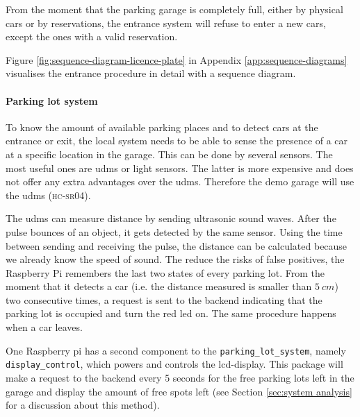 \ind From the moment that the parking garage is completely full, either by physical cars or by reservations, the entrance system will refuse to enter a new cars, except the ones with a valid reservation.

\ind Figure \ref{fig:sequence-diagram-licence-plate} in Appendix \ref{app:sequence-diagrams} visualises the entrance procedure in detail with a sequence diagram.

\paragraph{Parking lot system}
To know the amount of available parking places and to detect cars at the entrance or exit, the local system needs to be able to sense the presence of a car at a specific location in the garage. This can be done by several sensors. The most useful ones are \ac{udms} or light sensors. The latter is more expensive and does not offer any extra advantages over the \ac{udms}. Therefore the demo garage will use the \ac{udms} (\textsc{hc-sr04}).

\ind The \ac{udms} can measure distance by sending ultrasonic sound waves. After the pulse bounces of an object, it gets detected by the same sensor. Using the time between sending and receiving the pulse, the distance can be calculated because we already know the speed of sound. The reduce the risks of false positives, the Raspberry Pi remembers the last two states of every parking lot. From the moment that it detects a car (i.e. the distance measured is smaller than $5 \ \unit{cm}$) two consecutive times, a request is sent to the backend indicating that the parking lot is occupied and turn the red \ac{led} on. The same procedure happens when a car leaves. 

\ind One Raspberry pi has a second component to the \verb|parking_lot_system|, namely \verb|display_control|, which powers and controls the \ac{lcd}-display. This package will make a request to the backend every 5 seconds for the free parking lots left in the garage and display the amount of free spots left (see Section \ref{sec:system analysis} for a discussion about this method).

